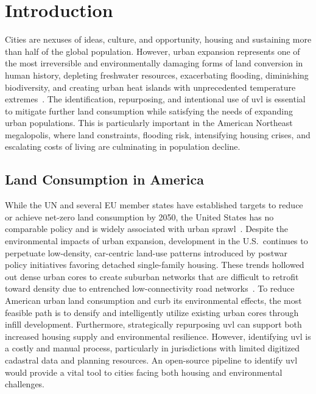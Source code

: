 \chapter{Introduction}
\label{ch:introduction}

Cities are nexuses of ideas, culture, and opportunity, housing and sustaining more than half of the global population. However, urban expansion represents one of the most irreversible and environmentally damaging forms of land conversion in human history, depleting freshwater resources, exacerbating flooding, diminishing biodiversity, and creating urban heat islands with unprecedented temperature extremes~\cite{gao2020Mapping,zhang2018Urbanization}. The identification, repurposing, and intentional use of \acrfull{uvl} is essential to mitigate further land consumption while satisfying the needs of expanding urban populations. This is particularly important in the American Northeast megalopolis, where land constraints, flooding risk, intensifying housing crises, and escalating costs of living are culminating in population decline.

\section{Land Consumption in America}
\label{sec:land_consumption}

While the UN and several EU member states have established targets to reduce or achieve net-zero land consumption by 2050, the United States has no comparable policy and is widely associated with urban sprawl~\cite{xu2022Automatica,barrington-leigh2015century}. Despite the environmental impacts of urban expansion, development in the U.S.\ continues to perpetuate low-density, car-centric land-use patterns introduced by postwar policy initiatives favoring detached single-family housing. These trends hollowed out dense urban cores to create suburban networks that are difficult to retrofit toward density due to entrenched low-connectivity road networks~\cite{barrington-leigh2015century}. To reduce American urban land consumption and curb its environmental effects, the most feasible path is to densify and intelligently utilize existing urban cores through infill development. Furthermore, strategically repurposing \acrshort{uvl} can support both increased housing supply and environmental resilience. However, identifying \acrshort{uvl} is a costly and manual process, particularly in jurisdictions with limited digitized cadastral data and planning resources. An open-source pipeline to identify \acrshort{uvl} would provide a vital tool to cities facing both housing and environmental challenges.

